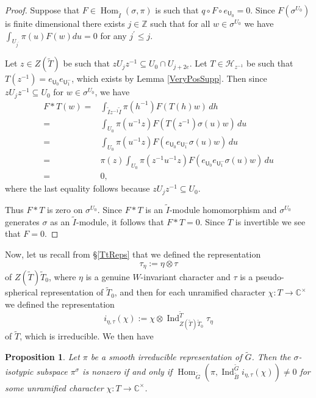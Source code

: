 \documentclass[10pt, letterpaper]{amsart}
\theoremstyle{plain}
\newtheorem{Prop}[equation]{Proposition}
\theoremstyle{definition}
\numberwithin{equation}{section}
\newcommand{\C}{\mathbb{C}}
\newcommand{\Bt}{\widetilde{B}}
\newcommand{\Gt}{\widetilde{G}}
\newcommand{\It}{\widetilde{I}}
\newcommand{\Tt}{\widetilde{T}}
\newcommand{\Ind}{\operatorname{Ind}}
\newcommand{\Hom}{\operatorname{Hom}}
\newcommand{\Hcal}{\mathcal{H}}
\newcommand{\Uf}{\mathsf{U}}
\begin{document}
\begin{proof}
	Suppose that $F\in \Hom_{\It}(\sigma,\pi)$ is such that $q\circ F\circ e_{{\Uf}_{0}}=0$. Since $F(\sigma^{U_{0}})$ is finite dimensional there exists $j\in\mathbb{Z}$ such that for all $w\in \sigma^{U_{0}}$ we have $\int_{U_{j^{\prime}}}\pi(u) F(w)du=0$ for any $j^{\prime}\leq j$.
	
	Let $z\in Z(\Tt)$ be such that $zU_{j}z^{-1}\subseteq U_{0}\cap U_{j+2e}$. Let $T\in\Hcal_{z^{-1}}$ be such that $T(z^{-1})=e_{{\Uf}_{0}}e_{{\Uf}^{-}_{1}}$, which exists by Lemma \ref{VeryPosSupp}. Then since $zU_{j}z^{-1}\subseteq U_{0}$ for $w\in \sigma^{U_{0}}$, we have 
	\begin{align*}
		F*T(w)=& \int_{\It z^{-1}\It}\pi(h^{-1})F(T(h)w)\,dh\\
		=&\int_{U_{0}}\pi(u^{-1}z)F(T(z^{-1})\sigma(u)w)\,du\\
		=&\int_{U_{0}}\pi(u^{-1}z)F(e_{{\Uf}_{0}}e_{{\Uf}^{-}_{1}}\sigma(u)w)\,du\\
		=&\pi(z)\int_{U_{0}}\pi(z^{-1}u^{-1}z)F(e_{{\Uf}_{0}}e_{{\Uf}^{-}_{1}}\sigma(u)w)\,du\\
		=&0,
	\end{align*}
        where the last equality follows because $zU_{j}z^{-1}\subseteq U_{0}$.
    
	Thus $F*T$ is zero on $\sigma^{U_{0}}$. Since $F*T$ is an $\It$-module homomorphism and $\sigma^{U_{0}}$ generates $\sigma$ as an $\It$-module, it follows that $F*T=0$. Since $T$ is invertible we see that $F=0$.
\end{proof}

Now, let us recall from \S \ref{TtReps} that we defined the representation
\[
\tau_\eta:=\eta\otimes\tau
\]
of $Z(\Tt)\Tt_0$, where $\eta$ is a genuine $W$-invariant character and $\tau$ is a pseudo-spherical representation of $\Tt_0$, and then for each unramified character $\chi:T\to\C^\times$ we defined the representation 
\[
i_{\eta,\tau}(\chi):=\chi\otimes\Ind_{Z(\Tt)\Tt_0}^{\Tt}\tau_{\eta}
\]
of $\Tt$, which is irreducible. We then have

\begin{Prop}\label{PSeriesConstits}
    Let $\pi$ be a smooth irreducible representation of $\Gt$. Then the $\sigma$-isotypic subspace $\pi^{\sigma}$ is nonzero if and only if $\Hom_{\Gt}(\pi,\Ind_{\Bt}^{\Gt}i_{\eta,\tau}(\chi))\neq 0$ for some unramified character $\chi:T\rightarrow \mathbb{C}^{\times}$. 
\end{Prop}
\end{document}
